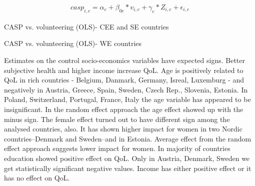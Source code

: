 \documentclass[10pt, letterpaper]{article}
\begin{document}
\begin{spacing}{1.4}
  \begin{eqnarray}
	casp_{i,c}= \alpha_{c}+ \beta_{0c}*v_{i,c} + \gamma_{c}*Z_{i,c} + \epsilon_{i,c}
 \end{eqnarray}


\begin{spacing}{.9}
\begin{table}[H]
\centering 
\caption{CASP vs. volunteering (OLS)- CEE and SE countries}  
\begin{scriptsize} 
	 
      \label{pooling} 
\end{scriptsize}
\end{table}
\end{spacing}

\begin{spacing}{.9}
\begin{table}[H]
\centering 
\caption{CASP vs. volunteering (OLS)- WE countries}  
\begin{scriptsize} 
	 
      \label{pooling} 
\end{scriptsize}
\end{table}
\end{spacing}

Estimates on the control socio-economics variables have expected signs. Better subjective health and higher income increase QoL. Age is positively related to QoL in rich countries - Belgium, Danmark, Germany, Isreal, Luxemburg - and negatively in Austria, Greece, Spain, Sweden, Czech Rep.,  Slovenia, Estonia. In Poland, Switzerland, Portugal, France, Italy the age variable has appeared to be insignificant. In the random effect approach the age effect  showed up with the minus sign. The female effect turned out to have different sign among the analysed countries, also.  It has shown higher impact for women in two Nordic countries--Denmark and Sweden--and in Estonia. Average effect from the random effect approach suggests lower impact for women. In majority of countries education showed positive effect on QoL. Only in Austria, Denmark, Sweden we get statistically significant negative values. Income has either positive effect or it has no effect on QoL. \\ 


\end{spacing}
\end{document}
